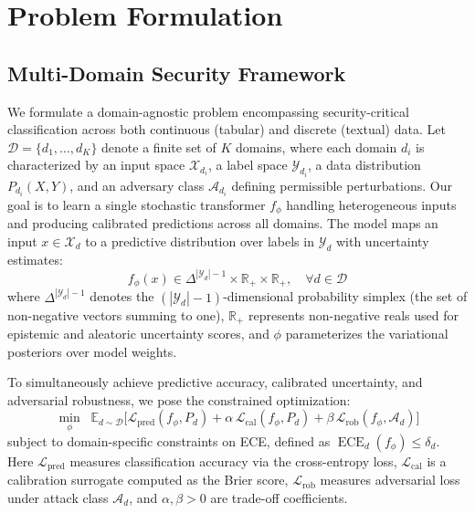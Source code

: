 \documentclass[12pt,a4paper]{article}
\theoremstyle{definition}
\DeclareMathOperator{\ECE}{ECE}
\begin{document}
\section{Problem Formulation}

\subsection{Multi-Domain Security Framework}

We formulate a domain-agnostic problem encompassing security-critical classification across both continuous (tabular) and discrete (textual) data. Let $\mathcal{D}=\{d_{1},\dots,d_{K}\}$ denote a finite set of $K$ domains, where each domain $d_i$ is characterized by an input space $\mathcal{X}_{d_i}$, a label space $\mathcal{Y}_{d_i}$, a data distribution $P_{d_i}(X,Y)$, and an adversary class $\mathcal{A}_{d_i}$ defining permissible perturbations. Our goal is to learn a single stochastic transformer $f_{\phi}$ handling heterogeneous inputs and producing calibrated predictions across all domains. The model maps an input $x\in\mathcal{X}_{d}$ to a predictive distribution over labels in $\mathcal{Y}_d$ with uncertainty estimates:
\begin{equation}
f_{\phi}(x) \in \Delta^{|\mathcal{Y}_{d}|-1} \times \mathbb{R}_{+} \times \mathbb{R}_{+},\quad \forall d\in\mathcal{D}
\end{equation}
where $\Delta^{|\mathcal{Y}_{d}|-1}$ denotes the $(|\mathcal{Y}_{d}|-1)$-dimensional probability simplex (the set of non-negative vectors summing to one), $\mathbb{R}_{+}$ represents non-negative reals used for epistemic and aleatoric uncertainty scores, and $\phi$ parameterizes the variational posteriors over model weights.

To simultaneously achieve predictive accuracy, calibrated uncertainty, and adversarial robustness, we pose the constrained optimization:
\begin{equation}
\label{eq:unified_objective}
\min_{\phi}\;\;\mathbb{E}_{d\sim\mathcal{D}}\Big[\mathcal{L}_{\mathrm{pred}}(f_{\phi},P_{d}) + \alpha\,\mathcal{L}_{\mathrm{cal}}(f_{\phi},P_{d}) + \beta\,\mathcal{L}_{\mathrm{rob}}(f_{\phi},\mathcal{A}_{d})\Big]
\end{equation}
subject to domain-specific constraints on ECE, defined as $\ECE_{d}(f_{\phi}) \le \delta_{d}$. Here $\mathcal{L}_{\mathrm{pred}}$ measures classification accuracy via the cross-entropy loss, $\mathcal{L}_{\mathrm{cal}}$ is a calibration surrogate computed as the Brier score, $\mathcal{L}_{\mathrm{rob}}$ measures adversarial loss under attack class $\mathcal{A}_{d}$, and $\alpha, \beta > 0$ are trade-off coefficients.
\end{document}
